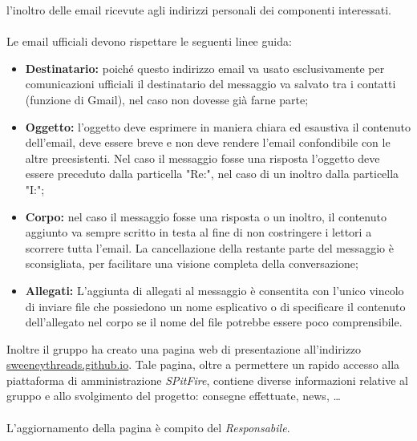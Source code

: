 \documentclass[a4paper]{article}
\begin{document}
	l'inoltro delle email ricevute agli indirizzi personali dei componenti interessati.
	\\ \\
	Le email ufficiali devono rispettare le seguenti linee guida:
	\begin{itemize}
		\item \textbf{Destinatario:} poiché questo indirizzo email va usato esclusivamente per comunicazioni ufficiali il destinatario
		del messaggio va salvato tra i contatti (funzione di Gmail), nel caso non dovesse già farne parte;
		\item \textbf{Oggetto:} l'oggetto deve esprimere in maniera chiara ed esaustiva il contenuto dell'email, deve essere breve
		 e non deve rendere l'email confondibile con le altre preesistenti.
		 Nel caso il messaggio fosse una risposta l'oggetto deve essere preceduto dalla particella "Re:", nel caso di un inoltro dalla
		 particella "I:";
		\item \textbf{Corpo:} nel caso il messaggio fosse una risposta o un inoltro, il contenuto aggiunto va sempre scritto in testa al
		fine di non costringere i lettori a scorrere tutta l'email. La cancellazione della restante parte del messaggio è sconsigliata, per
		facilitare una visione completa della conversazione;
		\item \textbf{Allegati:} L'aggiunta di allegati al messaggio è consentita con l'unico vincolo di inviare file che possiedono un nome
		esplicativo o di specificare il contenuto dell'allegato nel corpo se il nome del file potrebbe essere poco comprensibile.
	\end{itemize}
	Inoltre il gruppo ha creato una pagina web di presentazione all'indirizzo \url{sweeneythreads.github.io}. Tale pagina, oltre a permettere un rapido accesso alla piattaforma di amministrazione \emph{SPitFire}, contiene diverse informazioni relative al gruppo e allo svolgimento del progetto: consegne effettuate, news, \dots
	\\ \\
	L'aggiornamento della pagina è compito del \emph{Responsabile}.
\end{document}
